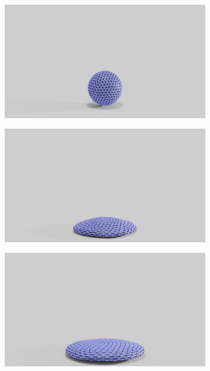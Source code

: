 \begin{figure}[htp!]
	\centering
	\begin{subfigure}{.03\linewidth}
	\end{subfigure}%
	\begin{subfigure}{.16\linewidth}
		\centering
		{\includegraphics[width=2.0\textwidth]{images/coarse_ball/045/0200.jpg}}
		\label{sfig:ball-045-1}
	\end{subfigure}%
	\begin{subfigure}{.16\linewidth}
		\centering
		{\includegraphics[width=2.0\textwidth]{images/coarse_ball/045/0250.jpg}}
		\label{sfig:ball-045-2}
	\end{subfigure}%
	\begin{subfigure}{.16\linewidth}
		\centering
		{\includegraphics[width=2.0\textwidth]{images/coarse_ball/045/0300.jpg}}

\end{subfigure}
\end{figure}
